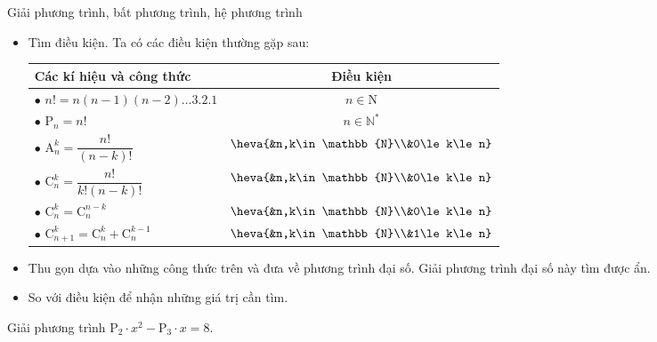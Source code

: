 \begin{dang}
	{Giải phương trình, bất phương trình, hệ phương trình}
	\begin{itemize}
		\item Tìm điều kiện. Ta có các điều kiện thường gặp sau:
		\begin{center}
			\begin{tabular}{ l|c } 
				Các kí hiệu và công thức & Điều kiện \\ 
				\hline
				$\bullet$ $n!=n(n-1)(n-2)\ldots3.2.1$ & $n\in\mathrm{N}$ \\ 
				\hline
				$\bullet$ $\mathrm{P}_n=n!$ & $n\in\mathbb{N}^*$ \\ 
				\hline
				$\bullet$ $\mathrm{A}_n^k=\dfrac{n!}{(n-k)!}$ & $\heva{&n,k\in\mathbb{N}\\&0\le k\le n}$ \\
				\hline
				$\bullet$ $\mathrm{C}_n^k=\dfrac{n!}{k!(n-k)!}$ & $\heva{&n,k\in\mathbb{N}\\&0\le k\le n}$ \\
				\hline
				$\bullet$ $\mathrm{C}_n^k=\mathrm{C}_n^{n-k}$ & $\heva{&n,k\in\mathbb{N}\\&0\le k\le n}$ \\
				\hline
				$\bullet$ $\mathrm{C}_{n+1}^k=\mathrm{C}_n^k+\mathrm{C}_n^{k-1}$ & $\heva{&n,k\in\mathbb{N}\\&1\le k\le n}$ \\
			\end{tabular}
		\end{center}
		\item Thu gọn dựa vào những công thức trên và đưa về phương trình đại số. Giải phương trình đại số này tìm được ẩn.
		\item So với điều kiện để nhận những giá trị cần tìm.
	\end{itemize}
\end{dang}
\begin{vd}%
	Giải phương trình $\mathrm{P}_2\cdot x^2-\mathrm{P}_3\cdot x=8$. 
\end{vd}
